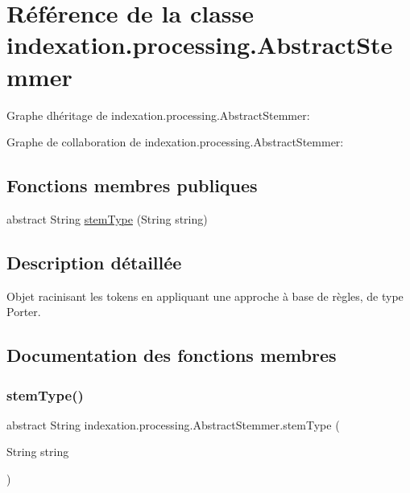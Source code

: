 \hypertarget{classindexation_1_1processing_1_1AbstractStemmer}{}\section{Référence de la classe indexation.\+processing.\+Abstract\+Stemmer}
\label{classindexation_1_1processing_1_1AbstractStemmer}


Graphe d\textquotesingle{}héritage de indexation.\+processing.\+Abstract\+Stemmer\+:


Graphe de collaboration de indexation.\+processing.\+Abstract\+Stemmer\+:
\subsection*{Fonctions membres publiques}
\begin{DoxyCompactItemize}
\item 
abstract String \hyperlink{classindexation_1_1processing_1_1AbstractStemmer_aa9c8c6a8161cd79538f14e52e73c42b4}{stem\+Type} (String string)
\end{DoxyCompactItemize}


\subsection{Description détaillée}
Objet racinisant les tokens en appliquant une approche à base de règles, de type Porter. 

\subsection{Documentation des fonctions membres}
\mbox{\label{classindexation_1_1processing_1_1AbstractStemmer_aa9c8c6a8161cd79538f14e52e73c42b4}} 
\subsubsection{\texorpdfstring{stem\+Type()}{stemType()}}
{\footnotesize\ttfamily abstract String indexation.\+processing.\+Abstract\+Stemmer.\+stem\+Type (\begin{DoxyParamCaption}\item[{String}]{string }\end{DoxyParamCaption})\hspace{0.3cm}{\ttfamily [abstract]}}

